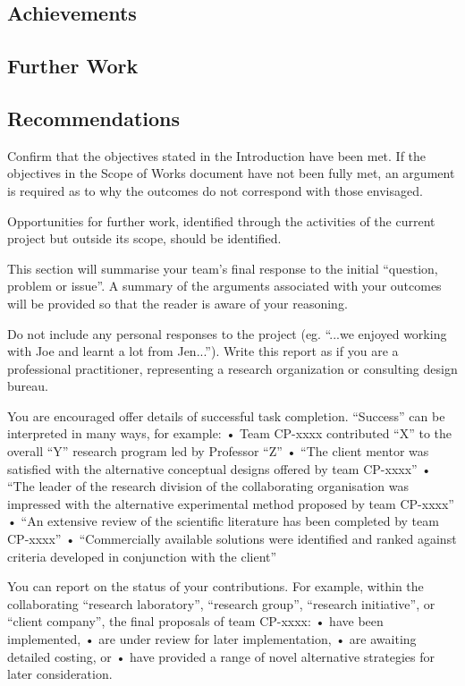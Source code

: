 \subsection{Achievements}


\subsection{Further Work}


\subsection{Recommendations}


\color{red}
Confirm that the objectives stated in the Introduction have been met. If the objectives in the Scope of Works document have not been fully met, an argument is required as to why the outcomes do not correspond with those envisaged.

Opportunities for further work, identified through the activities of the current project but outside its scope, should be identified.

This section will summarise your team’s final response to the initial “question, problem or issue”.  A summary of the arguments associated with your outcomes will be provided so that the reader is aware of your reasoning.

Do not include any personal responses to the project (eg. “...we enjoyed working with Joe and learnt a lot from Jen...”).  Write this report as if you are a professional practitioner, representing a research organization or consulting design bureau.

You are encouraged offer details of successful task completion. “Success” can be interpreted in many ways, for example: 
•	Team CP-xxxx contributed “X” to the overall “Y” research program led by Professor “Z”
•	“The client mentor was satisfied with the alternative conceptual designs offered by team CP-xxxx”
•	“The leader of the research division of the collaborating organisation was impressed with the alternative experimental method proposed by team CP-xxxx”
•	“An extensive review of the scientific literature has been completed by team CP-xxxx”
•	“Commercially available solutions were identified and ranked against criteria developed in conjunction with the client”

You can report on the status of your contributions.  For example, within the collaborating “research laboratory”, “research group”, “research initiative”, or “client company”, the final proposals of team CP-xxxx:
•	have been implemented,
•	are under review for later implementation,
•	are awaiting detailed costing, or
•	have provided a range of novel alternative strategies for later consideration.

